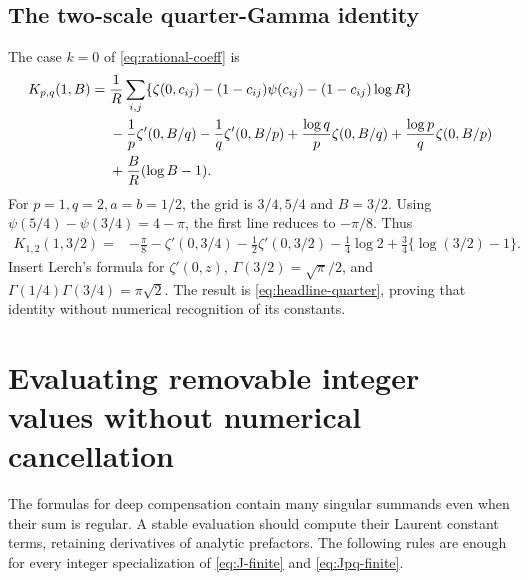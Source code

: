 \subsection{The two-scale quarter-Gamma identity}
The case $k=0$ of \eqref{eq:rational-coeff} is
\begin{align}
 K_{p,q}(1,B)={}&\frac1R\sum_{i,j}
   \{\zeta(0,c_{ij})-(1-c_{ij})\psi(c_{ij})
                              -(1-c_{ij})\log R\}\notag\\
 &-\frac1p\zeta'(0,B/q)-\frac1q\zeta'(0,B/p)
   +\frac{\log q}{p}\zeta(0,B/q)
   +\frac{\log p}{q}\zeta(0,B/p)\notag\\
 &+\frac BR(\log B-1).
                         \label{eq:Kpq-one}
\end{align}
For $p=1,q=2,a=b=1/2$, the grid is $3/4,5/4$ and $B=3/2$.
Using
$\psi(5/4)-\psi(3/4)=4-\pi$, the first line reduces to $-\pi/8$.
Thus
\begin{align*}
 K_{1,2}(1,3/2)={}&-\frac\pi8-\zeta'(0,3/4)
       -\frac12\zeta'(0,3/2)-\frac14\log2
       +\frac34\{\log(3/2)-1\}.
\end{align*}
Insert Lerch's formula for $\zeta'(0,z)$,
$\Gamma(3/2)=\sqrt\pi/2$, and
$\Gamma(1/4)\Gamma(3/4)=\pi\sqrt2$.
The result is \eqref{eq:headline-quarter}, proving that identity without
numerical recognition of its constants.

\section{Evaluating removable integer values without numerical cancellation}
\label{sec:finite-part-engine}

The formulas for deep compensation contain many singular summands even
when their sum is regular. A stable evaluation should compute their
Laurent constant terms, retaining derivatives of analytic prefactors.
The following rules are enough for every integer specialization of
\eqref{eq:J-finite} and \eqref{eq:Jpq-finite}.

